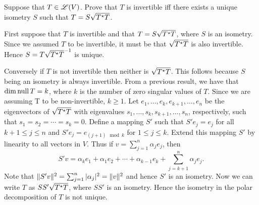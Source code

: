 \begin{exercise}
Suppose that $T \in \mathscr{L}(V)$. Prove that $T$ is invertible iff there exists
a unique isometry $S$ such that $T = S \sqrt{T^{\star} T}$.
\end{exercise}
\begin{solution}
First suppose that $T$ is invertible and that $T = S \sqrt{T^{\star} T}$,
where $S$ is an isometry. Since we assumed $T$ to be invertible, it must be that
$\sqrt{T^{\star} T}$ is also invertible. Hence $S = T \sqrt{T^{\star} T}^{-1}$ is unique.

Conversely if $T$ is not invertible then neither is $\sqrt{T^{\star} T}$. This follows
because $S$ being an isometry is always invertible. From a previous result, we have
that $\dim \operatorname{null} T = k$, where $k$ is the number of zero singular values of $T$.
Since we are assuming T to be non-invertible, $k \geq 1$. Let
$e_1, \ldots, e_k, e_{k + 1}, \ldots, e_n$ be the eigenvectors of $\sqrt{T^{\star} T}$
with eigenvalues $s_1, \ldots, s_k, s_{k + 1}, \ldots, s_n$, respectively,
such that $s_1 = s_2 = \cdots = s_k = 0$. Define a mapping $S'$ such that
$S' e_j = e_j$ for all $k + 1 \leq j \leq n$ and $S' e_j = e_{(j + 1) \mod k}$
for $1 \leq j \leq k$. Extend this mapping $S'$ by linearity to all vectors in $V$.
Thus if $v = \sum_{j = 1}^n \alpha_j e_j$, then
\[
    S' v = \alpha_k e_1 + \alpha_1 e_2 + \cdots + \alpha_{k - 1} e_{k} +
            \sum_{j = k + 1}^n \alpha_j e_j.
\]
Note that $\lVert S' v\rVert^2 = \sum_{j = 1}^n |\alpha_j|^2 = \lVert v\rVert^2$ and hence
$S'$ is an isometry. Now we can write $T$ as $S S' \sqrt{T^{\star} T}$, where $S S'$
is an isometry. Hence the isometry in the polar decomposition of $T$ is not unique.
\end{solution}
